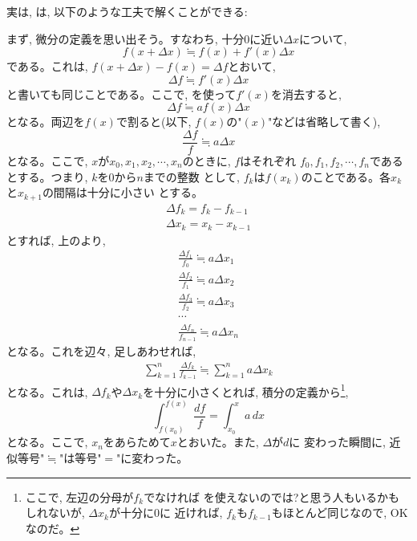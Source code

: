 実は, は, 以下のような工夫で解くことができる: 


まず, 微分の定義を思い出そう。すなわち, 十分0に近い$\Delta x$について,
\begin{equation}f(x+\Delta x)\fallingdotseq f(x)+f'(x)\Delta x\end{equation}
である。これは, $f(x+\Delta x)-f(x)=\Delta f$とおいて, 
\begin{equation}\Delta f \fallingdotseq f'(x)\Delta x\end{equation}
と書いても同じことである。ここで, を使って$f'(x)$を消去すると,  
\begin{equation}\Delta f \fallingdotseq a f(x)\Delta x\label{eq:difex3d}\end{equation}
となる。両辺を$f(x)$で割ると(以下, $f(x)$の"$(x)$"などは省略して書く), 
\begin{equation}\frac{\Delta f}{f} \fallingdotseq a \Delta x\label{eq:difeq7}\end{equation}
となる。ここで, $x$が$x_0, x_1, x_2, \cdots, x_n$のときに, $f$はそれぞれ
$f_0, f_1, f_2, \cdots, f_n$であるとする。つまり, $k$を0から$n$までの整数
として, $f_k$は$f(x_k)$のことである。各$x_k$と$x_{k+1}$の間隔は十分に小さい
とする。
\begin{eqnarray}
\Delta f_k=f_k-f_{k-1}\\
\Delta x_k=x_k-x_{k-1}
\end{eqnarray}
とすれば, 上のより, 
\begin{eqnarray*}
\frac{\Delta f_1}{f_0} \fallingdotseq a \Delta x_1\\
\frac{\Delta f_2}{f_1} \fallingdotseq a \Delta x_2\\
\frac{\Delta f_3}{f_2} \fallingdotseq a \Delta x_3\\
\cdots\\
\frac{\Delta f_n}{f_{n-1}} \fallingdotseq a \Delta x_n
\end{eqnarray*}
となる。これを辺々, 足しあわせれば, 
\begin{eqnarray}
\sum^{n}_{k=1} \frac{\Delta f_k}{f_{k-1}} \fallingdotseq \sum^{n}_{k=1} a \Delta x_k\label{eq:difeq70}
\end{eqnarray}
となる。これは, $\Delta f_k$や$\Delta x_k$を十分に小さくとれば, 
積分の定義から\footnote{ここで, 左辺の分母が$f_{k}$でなければ
を使えないのでは?と思う人もいるかもしれないが, $\Delta x_k$が十分に0に
近ければ, $f_k$も$f_{k-1}$もほとんど同じなので, OKなのだ。},
\begin{equation}\int_{f(x_0)}^{f(x)}\frac {df}{f} = \int_{x_0}^{x}a\, dx\end{equation}
となる。ここで, $x_n$をあらためて$x$とおいた。また, $\Delta$が$d$に
変わった瞬間に, 近似等号"$\fallingdotseq$"は等号"$=$"に変わった。

